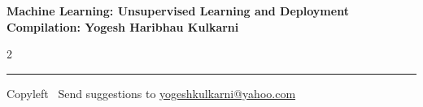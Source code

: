 \documentclass[8pt,landscape]{article}
\begin{document}
\footnotesize


\begin{center}
\Large{\textbf{Machine Learning: Unsupervised Learning and Deployment\\ Compilation: Yogesh Haribhau Kulkarni}}
\end{center}

\begin{multicols}{2}

\end{multicols}

\rule{\linewidth}{0.25pt}
\scriptsize
Copyleft \textcopyleft\  Send suggestions to
\href{http://www.yogeshkulkarni.com}{yogeshkulkarni@yahoo.com}
\end{document}
